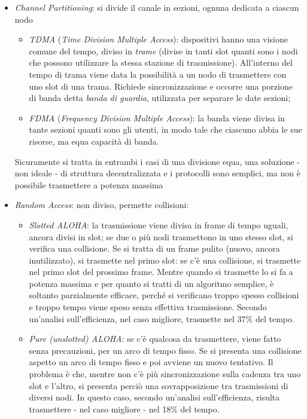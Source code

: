 \begin{itemize}
	\item \textit{Channel Partitioning}: si divide il canale in sezioni, ognuna dedicata a ciascun nodo
	\begin{itemize}
		\item \textit{TDMA} (\textit{Time Division Multiple Access}): dispositivi hanno una visione comune del tempo, diviso in \textit{trame} (divise in tanti slot quanti sono i nodi che possono utilizzare la stessa stazione di trasmissione). All'interno del tempo di trama viene data la possibilità a un nodo di trasmettere con uno slot di una trama. Richiede sincronizzazione e occorre una porzione di banda detta \textit{banda di guardia}, utilizzata per separare le date sezioni;
		\item \textit{FDMA} (\textit{Frequency Division Multiple Access}): la banda viene divisa in tante sezioni quanti sono gli utenti, in modo tale che ciascuno abbia le sue risorse, ma equa capacità di banda. 
	\end{itemize}
	Sicuramente si tratta in entrambi i casi di una divisione equa, una soluzione - non ideale - di struttura decentralizzata e i protocolli sono semplici, ma non è possibile trasmettere a potenza massima 
	\item \textit{Random Access}: non diviso, permette collisioni:
	\begin{itemize}
		\item \textit{Slotted ALOHA}: la trasmissione viene divisa in frame di tempo uguali, ancora divisi in slot; se due o più nodi trasmettono in uno stesso slot, si verifica una collisione. Se si tratta di un frame pulito (nuovo, ancora inutilizzato), si trasmette nel primo slot: se c'è una collisione, si trasmette nel primo slot del prossimo frame. Mentre quando si trasmette lo si fa a potenza massima e per quanto si tratti di un algoritmo semplice, è soltanto parzialmente efficace, perché si verificano troppo spesso collisioni e troppo tempo viene speso senza effettiva trasmissione. Secondo un'analisi sull'efficienza, nel caso migliore, trasmette nel 37\% del tempo.
		\item \textit{Pure (unslotted) ALOHA}: se c'è qualcosa da trasmettere, viene fatto senza precauzioni, per un arco di tempo fisso. Se si presenta una collisione aspetto un arco di tempo fisso e poi avviene un nuovo tentativo. Il problema è che, mentre non c'è più sincronizzazione sulla cadenza tra uno slot e l'altro, si presenta perciò una sovrapposizione tra trasmissioni di diversi nodi. In questo caso, secondo un'analisi sull'efficienza, risulta trasmettere - nel caso migliore - nel 18\% del tempo.

\end{itemize}
\end{itemize}
